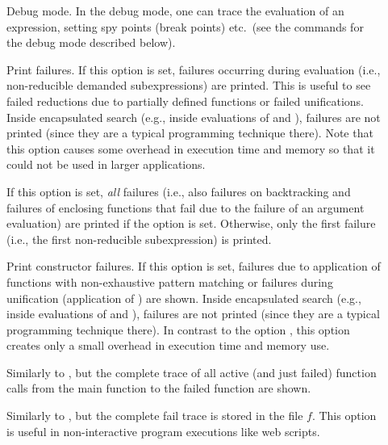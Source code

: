 \begin{description}
\item[] Debug mode.
In the debug mode, one can trace the evaluation of an expression,
setting spy points (break points) etc.\ (see the commands
for the debug mode described below).

\item[] Print failures.
If this option is set, failures occurring during evaluation
(i.e., non-reducible demanded subexpressions) are printed.
This is useful to see failed reductions due to partially
defined functions or failed unifications.
Inside encapsulated search (e.g., inside evaluations of
 and ), failures are not printed
(since they are a typical programming technique there).
Note that this option causes some overhead in execution time
and memory so that it could not be used in larger applications.

\item[]
If this option is set, \emph{all} failures
(i.e., also failures on backtracking and failures
of enclosing functions that fail due to the failure of an argument
evaluation) are printed if the option  is set.
Otherwise, only the first failure (i.e., the first non-reducible
subexpression) is printed.

\item[] Print constructor failures.
If this option is set, failures due to application of
functions with non-exhaustive pattern matching or failures
during unification (application of \ccode{=:=}) are shown.
Inside encapsulated search (e.g., inside evaluations of
 and ), failures are not printed
(since they are a typical programming technique there).
In contrast to the option ,
this option creates only a small overhead in execution time
and memory use.

\item[]
Similarly to , but the complete trace
of all active (and just failed) function calls from the main function
to the failed function are shown.

\item[]
Similarly to , but the complete fail trace
is stored in the file $f$. This option is useful in non-interactive
program executions like web scripts.


\end{description}
